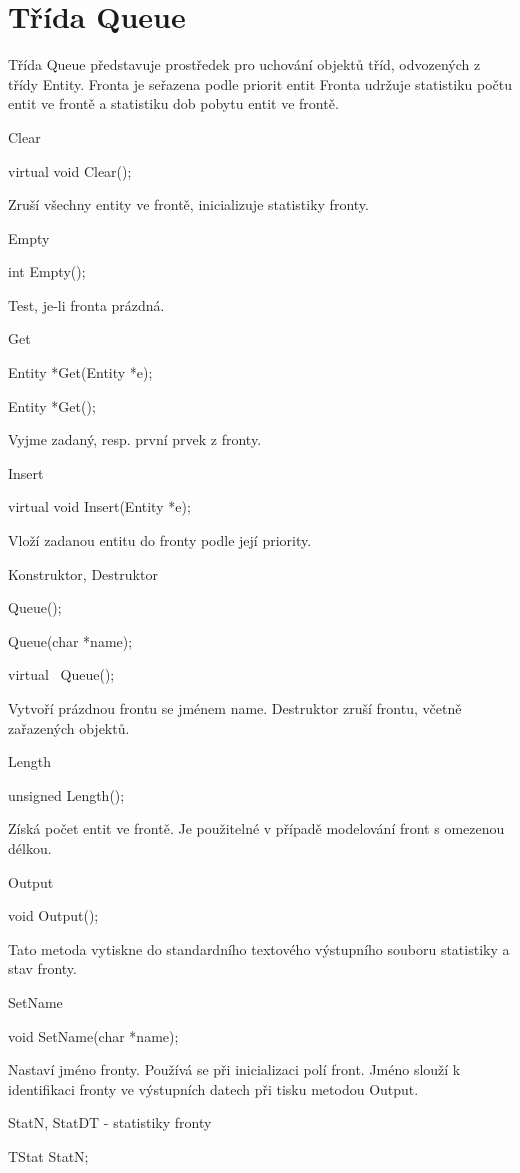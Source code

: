 \documentclass[a4paper]{article}
\begin{document}
\section{Třída Queue}

Třída Queue představuje prostředek pro uchování objektů
tříd, odvozených z třídy Entity. Fronta je seřazena podle
priorit entit Fronta udržuje statistiku počtu entit ve frontě a statistiku
dob pobytu entit ve frontě.


Clear

  virtual void Clear();


Zruší všechny entity ve frontě, inicializuje statistiky fronty.


Empty

  int Empty();


Test, je-li fronta prázdná.


Get

  Entity *Get(Entity *e);

  Entity *Get();


Vyjme zadaný, resp. první prvek z fronty.


Insert

  virtual void Insert(Entity *e);


Vloží zadanou entitu do fronty podle její priority.


Konstruktor, Destruktor

  Queue();

  Queue(char *name);

  virtual ~Queue();


Vytvoří prázdnou frontu se jménem name. Destruktor zruší
frontu, včetně zařazených objektů.


Length

  unsigned Length();


Získá počet entit ve frontě. Je použitelné v případě modelování front
s omezenou délkou.


Output

  void Output();


Tato metoda vytiskne do standardního textového výstupního souboru
statistiky a stav fronty.


SetName

  void SetName(char *name);


Nastaví jméno fronty. Používá se při inicializaci polí front. Jméno
slouží k identifikaci fronty ve výstupních datech při tisku metodou
Output.


StatN, StatDT - statistiky fronty

  TStat StatN;
\end{document}
